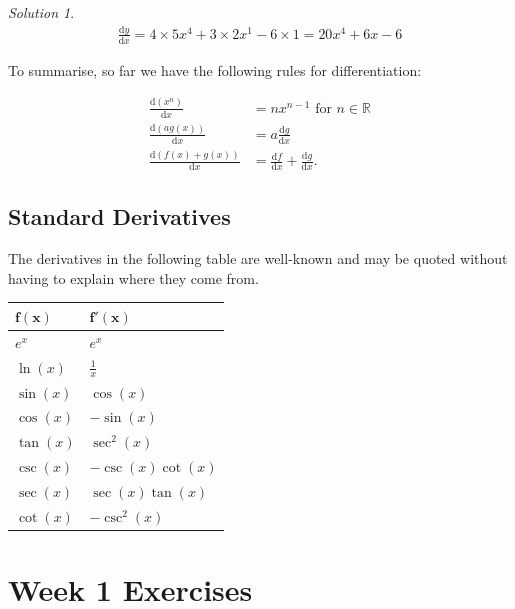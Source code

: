 \documentclass[
  english,
  11pt,
  oneside]{book}
\newcounter{none} %
\newcommand{\slide}{}
\theoremstyle{definition}
\theoremstyle{definition}
\theoremstyle{definition}
\theoremstyle{definition}
\theoremstyle{remark}
\newtheorem*{solution}{Solution}
\begin{document}
\begin{solution}
\begin{gather*}
\frac{\mathrm{d} y}{\mathrm{d} x} = 4\times5x^4 + 3\times 2x^1 - 6\times1 = 20x^4+6x-6
\end{gather*}
\end{solution}

\slide

To summarise, so far we have the following rules for differentiation:

\begin{align*}
\frac{\mathrm{d}(x^n)}{\mathrm{d} x} &= nx^{n-1}\text{ for }n\in{\mathbb R}\\
\frac{\mathrm{d}(ag(x))}{\mathrm{d} x} &= a\frac{\mathrm{d} g}{\mathrm{d} x}\\
\frac{\mathrm{d}(f(x)+g(x))}{\mathrm{d} x} &= \frac{\mathrm{d} f}{\mathrm{d} x}+\frac{\mathrm{d} g}{\mathrm{d} x}.
\end{align*}
\slide

\section{Standard Derivatives}\label{standard-derivatives}

The derivatives in the following table are well-known and may be quoted without having to explain where they come from.

{\def\LTcaptype{none} %
\begin{longtable}[]{@{}ll@{}}
\toprule\noalign{}
\(\mathbf{f(x)}\) & \(\mathbf{f'(x)}\) \\
\midrule\noalign{}
\endhead
\bottomrule\noalign{}
\endlastfoot
\(e^x\) & \(e^x\) \\
\(\ln(x)\) & \(\frac{1}{x}\) \\
\(\sin(x)\) & \(\cos(x)\) \\
\(\cos(x)\) & \(-\sin(x)\) \\
\(\tan(x)\) & \(\sec^2(x)\) \\
\(\csc(x)\) & \(-\csc(x)\cot(x)\) \\
\(\sec(x)\) & \(\sec(x)\tan(x)\) \\
\(\cot(x)\) & \(-\csc^2(x)\) \\
\end{longtable}
}

\chapter*{Week 1 Exercises}\label{week-1-exercises}
\end{document}
